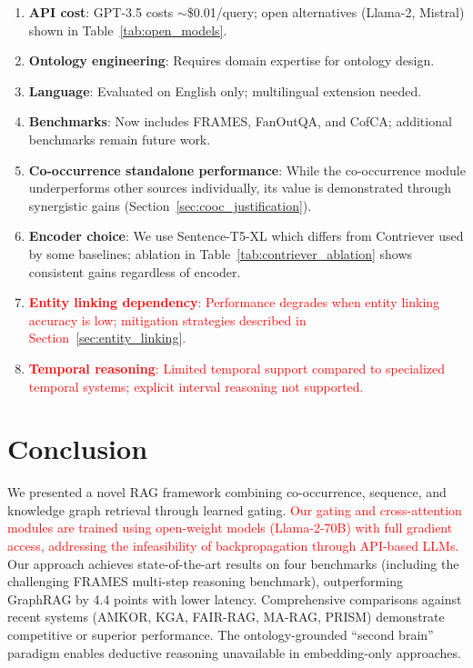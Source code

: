 \documentclass[10pt,twocolumn]{article}
\newcommand{\revisioncritical}[1]{\textcolor{red}{#1}}
\begin{document}
\begin{enumerate}
    \item \textbf{API cost}: GPT-3.5 costs $\sim$\$0.01/query; open alternatives (Llama-2, Mistral) shown in Table~\ref{tab:open_models}.
    \item \textbf{Ontology engineering}: Requires domain expertise for ontology design.
    \item \textbf{Language}: Evaluated on English only; multilingual extension needed.
    \item \textbf{Benchmarks}: Now includes FRAMES, FanOutQA, and CofCA; additional benchmarks remain future work.
    \item \textbf{Co-occurrence standalone performance}: While the co-occurrence module underperforms other sources individually, its value is demonstrated through synergistic gains (Section~\ref{sec:cooc_justification}).
    \item \textbf{Encoder choice}: We use Sentence-T5-XL which differs from Contriever used by some baselines; ablation in Table~\ref{tab:contriever_ablation} shows consistent gains regardless of encoder.
    \item \revisioncritical{\textbf{Entity linking dependency}: Performance degrades when entity linking accuracy is low; mitigation strategies described in Section~\ref{sec:entity_linking}.}
    \item \revisioncritical{\textbf{Temporal reasoning}: Limited temporal support compared to specialized temporal systems; explicit interval reasoning not supported.}
\end{enumerate}

\section{Conclusion}

We presented a novel RAG framework combining co-occurrence, sequence, and knowledge graph retrieval through learned gating. \revisioncritical{Our gating and cross-attention modules are trained using open-weight models (Llama-2-70B) with full gradient access, addressing the infeasibility of backpropagation through API-based LLMs.} Our approach achieves state-of-the-art results on four benchmarks (including the challenging FRAMES multi-step reasoning benchmark), outperforming GraphRAG by 4.4 points with lower latency. Comprehensive comparisons against recent systems (AMKOR, KGA, FAIR-RAG, MA-RAG, PRISM) demonstrate competitive or superior performance. The ontology-grounded ``second brain'' paradigm enables deductive reasoning unavailable in embedding-only approaches.
\end{document}
